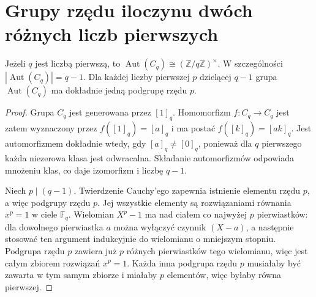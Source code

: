 \section{Grupy rzędu iloczynu dwóch różnych liczb pierwszych}
\begin{lemat}
\label{aa:lem:aut-cq}
Jeżeli $q$ jest liczbą pierwszą, to
$\operatorname{Aut}(C_q)\cong(\mathbb Z/q\mathbb Z)^\times$.
W szczególności $|\operatorname{Aut}(C_q)|=q-1$.
Dla każdej liczby pierwszej $p$ dzielącej $q-1$
grupa $\operatorname{Aut}(C_q)$ ma dokładnie jedną
podgrupę rzędu $p$.
\end{lemat}
\begin{proof}
Grupa $C_q$ jest generowana przez $[1]_q$.
Homomorfizm $f:C_q\to C_q$ jest zatem wyznaczony przez
$f([1]_q)=[a]_q$ i ma postać $f([k]_q)=[ak]_q$.
Jest automorfizmem dokładnie wtedy, gdy $[a]_q\ne[0]_q$,
ponieważ dla $q$ pierwszego każda niezerowa klasa jest
odwracalna. Składanie automorfizmów odpowiada mnożeniu klas,
co daje izomorfizm i liczbę $q-1$.

Niech $p\mid(q-1)$. Twierdzenie Cauchy'ego zapewnia istnienie
elementu rzędu $p$, a więc podgrupy rzędu $p$.
Jej wszystkie elementy są rozwiązaniami równania $x^p=1$
w ciele $\mathbb F_q$. Wielomian $X^p-1$ ma nad ciałem
co najwyżej $p$ pierwiastków: dla dowolnego pierwiastka $a$
można wyłączyć czynnik $(X-a)$, a następnie stosować ten
argument indukcyjnie do wielomianu o mniejszym stopniu.
Podgrupa rzędu $p$ zawiera już $p$ różnych pierwiastków
tego wielomianu, więc jest całym zbiorem rozwiązań $x^p=1$.
Każda inna podgrupa rzędu $p$ musiałaby być zawarta w tym
samym zbiorze i miałaby $p$ elementów, więc byłaby równa pierwszej.
\end{proof}

